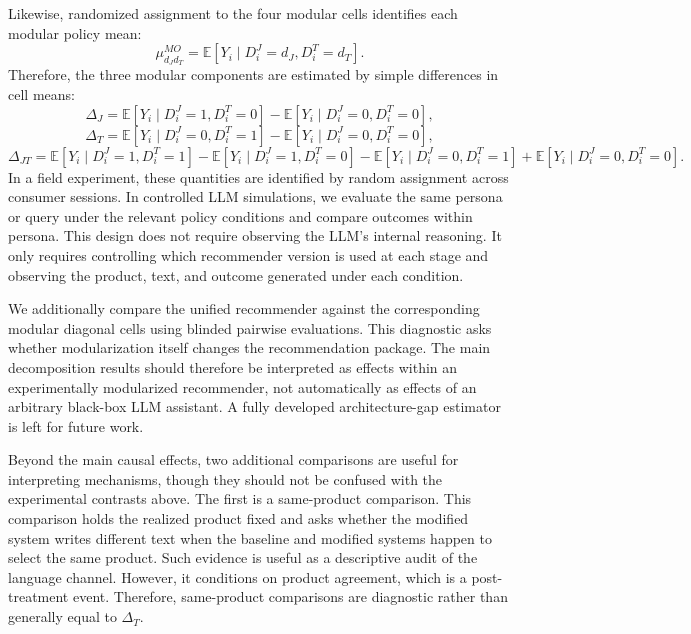 \documentclass[11pt]{article}
\newcommand{\Expect}{\mathbb{E}}
\newcommand{\Y}{Y}
\begin{document}
Likewise, randomized assignment to the four modular cells identifies each modular policy mean:
\begin{equation}
\mu_{d_Jd_T}^{MO} = \Expect[\Y_i \mid D_i^J = d_J, D_i^T = d_T].
\label{eq:identify-modular-cell}
\end{equation}
Therefore, the three modular components are estimated by simple differences in cell means:
\begin{equation*}
\Delta_J = \Expect[\Y_i \mid D_i^J = 1, D_i^T = 0] - \Expect[\Y_i \mid D_i^J = 0, D_i^T = 0],
\end{equation*}
\begin{equation*}
\Delta_T = \Expect[\Y_i \mid D_i^J = 0, D_i^T = 1] - \Expect[\Y_i \mid D_i^J = 0, D_i^T = 0],
\end{equation*}
\begin{equation*}
\Delta_{JT} = \Expect[\Y_i \mid D_i^J = 1, D_i^T = 1] - \Expect[\Y_i \mid D_i^J = 1, D_i^T = 0] - \Expect[\Y_i \mid D_i^J = 0, D_i^T = 1] + \Expect[\Y_i \mid D_i^J = 0, D_i^T = 0].
\end{equation*}
In a field experiment, these quantities are identified by random assignment across consumer sessions. In controlled LLM simulations, we evaluate the same persona or query under the relevant policy conditions and compare outcomes within persona. This design does not require observing the LLM's internal reasoning. It only requires controlling which recommender version is used at each stage and observing the product, text, and outcome generated under each condition.

We additionally compare the unified recommender against the corresponding modular diagonal cells using blinded pairwise evaluations. This diagnostic asks whether modularization itself changes the recommendation package. The main decomposition results should therefore be interpreted as effects within an experimentally modularized recommender, not automatically as effects of an arbitrary black-box LLM assistant. A fully developed architecture-gap estimator is left for future work.

Beyond the main causal effects, two additional comparisons are useful for interpreting mechanisms, though they should not be confused with the experimental contrasts above. The first is a same-product comparison. This comparison holds the realized product fixed and asks whether the modified system writes different text when the baseline and modified systems happen to select the same product. Such evidence is useful as a descriptive audit of the language channel. However, it conditions on product agreement, which is a post-treatment event. Therefore, same-product comparisons are diagnostic rather than generally equal to $\Delta_T$.
\end{document}
